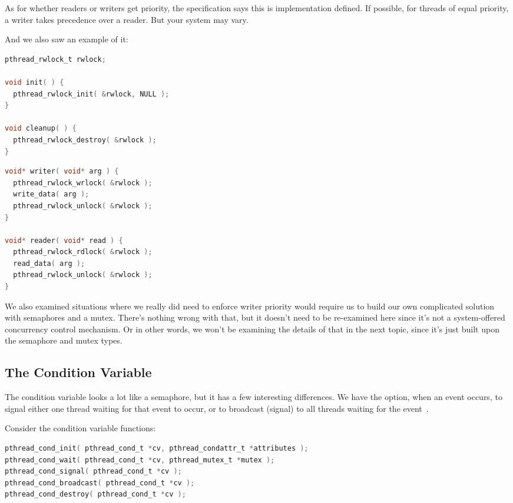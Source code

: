 As for whether readers or writers get priority, the specification says this is implementation defined. If possible, for threads of equal priority, a writer takes precedence over a reader. But your system may vary.

And we also saw an example of it: 
\begin{multicols}{2}
	\begin{lstlisting}[language=C]
pthread_rwlock_t rwlock;

void init( ) {
  pthread_rwlock_init( &rwlock, NULL );
}

void cleanup( ) {
  pthread_rwlock_destroy( &rwlock );
}
\end{lstlisting}

	\columnbreak

	\begin{lstlisting}[language=C]
void* writer( void* arg ) {
  pthread_rwlock_wrlock( &rwlock );
  write_data( arg );
  pthread_rwlock_unlock( &rwlock );
}

void* reader( void* read ) {
  pthread_rwlock_rdlock( &rwlock );
  read_data( arg );
  pthread_rwlock_unlock( &rwlock );
}
\end{lstlisting}

\end{multicols}

We also examined situations where we really did need to enforce writer priority would require us to build our own complicated solution with semaphores and a mutex. There's nothing wrong with that, but it doesn't need to be re-examined here since it's not a system-offered concurrency control mechanism. Or in other words, we won't be examining the details of that in the next topic, since it's just built upon the semaphore and mutex types.


\subsection*{The Condition Variable}

The condition variable looks a lot like a semaphore, but it has a few interesting differences. We have the option, when an event occurs, to signal either one thread waiting for that event to occur, or to broadcast (signal) to all threads waiting for the event~\cite{mte241}.

Consider the condition variable functions:

\begin{lstlisting}[language=C]
pthread_cond_init( pthread_cond_t *cv, pthread_condattr_t *attributes );
pthread_cond_wait( pthread_cond_t *cv, pthread_mutex_t *mutex );
pthread_cond_signal( pthread_cond_t *cv );
pthread_cond_broadcast( pthread_cond_t *cv );
pthread_cond_destroy( pthread_cond_t *cv );
\end{lstlisting}

